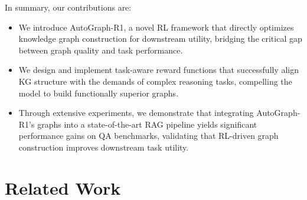 \documentclass[11pt]{article}
\begin{document}
In summary, our contributions are: 
\begin{itemize} 
    \item We introduce AutoGraph-R1, a novel RL framework that directly optimizes knowledge graph construction for downstream utility, bridging the critical gap between graph quality and task performance. 
    \item We design and implement task-aware reward functions that successfully align KG structure with the demands of complex reasoning tasks, compelling the model to build functionally superior graphs. 
    \item Through extensive experiments, we demonstrate that integrating AutoGraph-R1's graphs into a state-of-the-art RAG pipeline yields significant performance gains on QA benchmarks, validating that RL-driven graph construction improves downstream task utility. 
\end{itemize}

\section{Related Work}
\end{document}
